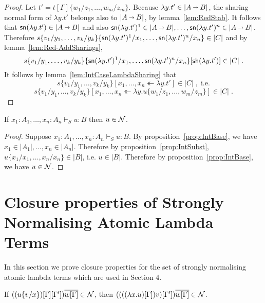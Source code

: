 \documentclass{llncs} %
\begin{document}
\begin{proof}
Let  $t' = t[\Gamma]\{w_1/z_1,\dots,w_m/z_m\}$. Because $\lambda y.t'\in |A \vlim B|$, the sharing normal form of $\lambda y.t'$ belongs also to $|A \vlim B|$, by lemma~\ref{lem:RedStab}. It follows that $\sn (\lambda y.t') \in |A \vlim B|$ and also $\sn (\lambda y.t')^1 \in |A \vlim B|, \dots, \sn (\lambda y.t')^n \in |A \vlim B|$. Therefore
$ s  \{v_1/y_1,\dots,v_k/y_k\}  \{{\mathsf{sn}} (\lambda y.t')^1/x_1,\dots, {\mathsf{sn}} (\lambda y.t')^n/x_n\} \in |C|$ and by lemma~\ref{lem:Red-AddSharings},
\[
s  \{v_1/y_1,\dots,v_k/y_k\}  \{{\mathsf{sn}} (\lambda y.t')^1/x_1,\dots, {\mathsf{sn}} (\lambda y.t')^n/x_n\}[{\mathsf{sh}} (\lambda y.t')] \in |C|\;.
\]
It follows by lemma~\ref{lem:IntCaseLambdaSharing} that
\[s \{v_1/y_1,\dots,v_k/y_k\}[x_1,\dots, x_n \twoheadleftarrow \lambda y.t'] \in |C|\;,\;\mbox{i.e.}\]
\[
s\{v_1/y_1,\dots,v_k/y_k\} [x_1,\dots, x_n \twoheadleftarrow \lambda y.u\{w_1/z_1,\dots,w_m/z_m\} ] \in |C|\;.
\]
\end{proof}


\begin{theorem}\label{thm:SN}
If $x_1:A_1,\dots, x_n:A_n \vdash_S u:B$ then $u \in \mathcal{N}$.
\end{theorem}



\begin{proof}

Suppose $x_1:A_1,\dots, x_n:A_n \vdash_S u:B$. By proposition~\ref{prop:IntBase}, we have $x_1\in |A_1|,\dots, x_n \in|A_n|$. Therefore by proposition~\ref{prop:IntSubst},  $u\{x_1/x_1, \dots, x_n/x_n\} \in |B|$, i.e. $u \in |B|$. Therefore by proposition~\ref{prop:IntBase}, we have $u \in \mathcal{N}$.

\end{proof}




\section{Closure properties of Strongly Normalising Atomic Lambda Terms}\label{sec:ClosPropSN}


In this section we prove closure properties for the set of strongly normalising atomic lambda terms
which are used in Section 4.

\begin{lemma}\label{lem:IntCaseLambda0}
If $((u\{v/x\})[\Gamma][\Gamma'])\overline{w[\Gamma]} \in \mathcal{N}$, then $((((\lambda x.u)[\Gamma]) v)[\Gamma'])\overline{w[\Gamma]} \in \mathcal{N}$.
\end{lemma}
\end{document}
